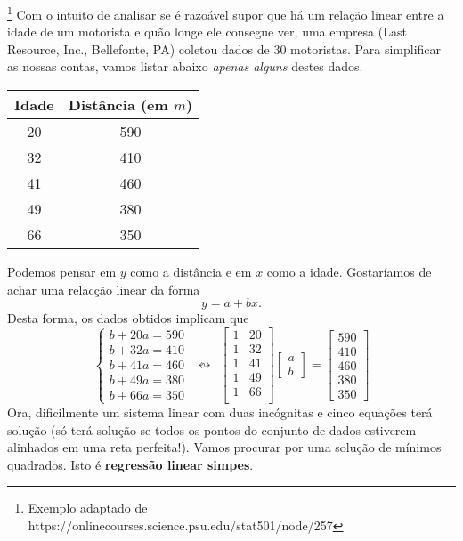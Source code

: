 \documentclass[../livro.tex]{subfiles}  %
\begin{document}
\begin{example}\footnote{Exemplo adaptado de https://onlinecourses.science.psu.edu/stat501/node/257}\label{exp:idade}
  Com o intuito de analisar se é razoável supor que há um relação linear entre a idade de um motorista e quão longe ele consegue ver, uma empresa (Last Resource, Inc., Bellefonte, PA) coletou dados de 30 motoristas. Para simplificar as nossas contas, vamos listar abaixo \textit{apenas alguns} destes dados.
  \begin{center}
    \begin{tabular}{|c|c|}
      \hline
      Idade & Distância (em $m$) \\ \hline
      20 & 590 \\
      32 & 410 \\
      41 & 460 \\
      49 & 380 \\
      66 & 350 \\
      \hline
    \end{tabular}
  \end{center} Podemos pensar em $y$ como a distância e em $x$ como a idade. Gostaríamos de achar uma relacção linear da forma
  \[
  y = a + b x.
  \] Desta forma, os dados obtidos implicam que  
  \[
  \left\{
    \begin{array}{ll}
      b + 20 a = 590 \\
      b + 32 a = 410 \\
      b + 41 a = 460 \\
      b + 49 a = 380 \\
      b + 66 a = 350
    \end{array}
  \right. \ \ \leftrightsquigarrow \ \
  \begin{bmatrix}
    1 & 20 \\
    1 & 32 \\
    1 & 41 \\
    1 & 49 \\
    1 & 66 \\
  \end{bmatrix}
  \begin{bmatrix}
    a \\ b
  \end{bmatrix} =
  \begin{bmatrix}
    590 \\ 410 \\ 460 \\ 380 \\ 350
  \end{bmatrix}
  \] Ora, dificilmente um sistema linear com duas incógnitas e cinco equações terá solução (só terá solução se todos os pontos do conjunto de dados estiverem alinhados em uma reta perfeita!). Vamos procurar por uma solução de mínimos quadrados. Isto é \textbf{regressão linear simpes}.


\end{example}
\end{document}

